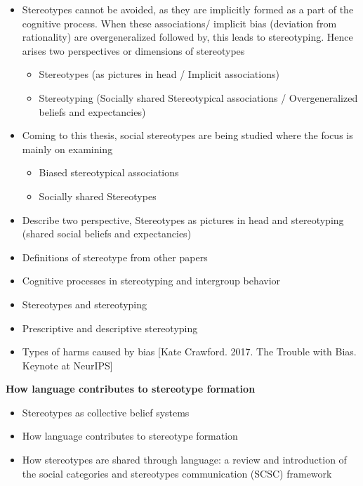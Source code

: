 \begin{itemize}
        \item Stereotypes cannot be avoided, as they are implicitly formed as a part of the cognitive process. When these associations/ implicit bias (deviation from rationality) are overgeneralized followed by, this leads to stereotyping. Hence arises two perspectives or dimensions of stereotypes 
            \begin{itemize}
                \item Stereotypes (as pictures in head / Implicit associations)
                \item Stereotyping (Socially shared Stereotypical associations / Overgeneralized beliefs and expectancies) 
            \end{itemize}
            \item Coming to this thesis, social stereotypes are being studied where the focus is mainly on examining 
            \begin{itemize}
                \item Biased stereotypical associations
                \item Socially shared Stereotypes
            \end{itemize}
\end{itemize}
\begin{itemize}
    \item Describe two perspective, Stereotypes as pictures in head and stereotyping (shared social beliefs and expectancies)
    \item Definitions of stereotype from other papers
    \item Cognitive processes in stereotyping and intergroup behavior \cite{hamilton2015cognitive}
    \item Stereotypes and stereotyping \cite{macrae1996stereotypes}
    \item Prescriptive and descriptive stereotyping
    \item Types of harms caused by bias [Kate Crawford. 2017. The Trouble with Bias. Keynote
at NeurIPS]
\end{itemize}
\textbf{How language contributes to stereotype formation}
    \begin{itemize}
        \item Stereotypes as collective belief systems \cite{macrae1996stereotypes}
        \item How language contributes to stereotype formation \cite{burgers2020language}
        \item How stereotypes are shared through language: a
    review and introduction of the social categories
    and stereotypes communication (SCSC) framework \cite{beukeboom2019stereotypes}
    \end{itemize}
